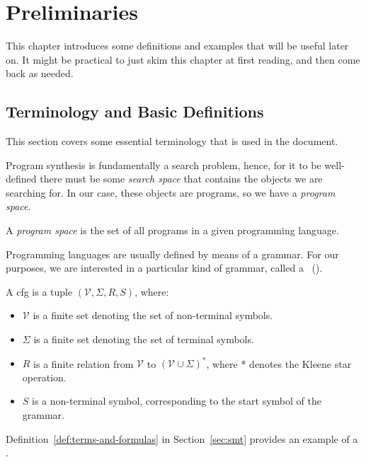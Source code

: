 \chapter{Preliminaries}
\label{chapter:preliminaries}

This chapter introduces some definitions and examples that will be useful later
on. It might be practical to just skim this chapter at first reading, and then
come back as needed.

\section{Terminology and Basic Definitions}
\label{sec:terminology}

This section covers some essential terminology that is used in the document.

Program synthesis is fundamentally a search problem, hence, for it to be
well-defined there must be some \textit{search space} that contains the objects
we are searching for.
In our case, these objects are programs, so we have a \textit{program space}.

\begin{definition}
  A \textit{program space} is the set of all programs in a given programming
language.
\end{definition}

Programming languages are usually defined by means of a grammar.
For our purposes, we are interested in a particular kind of grammar, called a
~().

\begin{definition}
  A \gls{cfg} is a tuple $(\mathcal{V}, \Sigma{}, R, S)$, where:
  \begin{itemize}
  \item $\mathcal{V}$ is a finite set denoting the set of non-terminal symbols.
  \item $\Sigma{}$ is a finite set denoting the set of terminal symbols.
  \item $R$ is a finite relation from $\mathcal{V}$ to $(\mathcal{V} \cup
    \Sigma{})^*$, where * denotes the Kleene star operation.
  \item $S$ is a non-terminal symbol, corresponding to the start symbol of the
    grammar.
  \end{itemize}
\end{definition}

Definition~\ref{def:terms-and-formulas} in Section~\ref{sec:smt} provides an
example of a .

